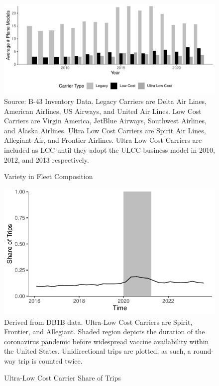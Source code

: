 \documentclass{article}
\begin{document}
\begin{appendices}
	\begin{figure}[h]
		\caption{Variety in Fleet Composition}
		\label{fig:Fleet_Composition}
		\includegraphics[width = \linewidth]{average_plane_types_in_use.pdf}
		\footnotesize{Source: B-43 Inventory Data. Legacy Carriers are Delta Air Lines, American Airlines, US Airways, and United Air Lines. Low Cost Carriers are Virgin America, JetBlue Airways, Southwest Airlines, and Alaska Airlines. Ultra Low Cost Carriers are Spirit Air Lines, Allegiant Air, and Frontier Airlines. Ultra Low Cost Carriers are included as LCC until they adopt the ULCC business model in  2010,  2012, and  2013 respectively.}
	\end{figure}
	
	\begin{figure}
		\caption{Ultra-Low Cost Carrier Share of Trips}
		\label{fig:ULCC_Trips}
		\includegraphics[width = \linewidth]{ULCC_Share}
		\footnotesize{Derived from DB1B data. Ultra-Low Cost Carriers are Spirit, Frontier, and Allegiant. Shaded region depicts the duration of the coronavirus pandemic before widespread vaccine availability within the United States. Unidirectional trips are plotted, as such, a round-way trip is counted twice.}
	\end{figure}
	

\end{appendices}
\end{document}
